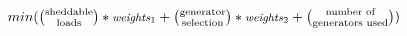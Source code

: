 \documentclass[10pt,journal,letterpaper,compsoc, draftclsnofoot, onecolumn]{IEEEtran} %
\newcommand*{\bfrac}[2]{\genfrac{(}{)}{0pt}{}{#1}{#2}} %
\begin{document}


$min(\bfrac{\text{sheddable}}{\text{loads}} * \text{\footnotesize \emph{weights}$_1$} +  \bfrac{\text{generator}}{\text{selection}} * \text{\footnotesize \emph{weights}$_2$} +  \bfrac{\text{number of}}{\text{generators used}})$
\end{document}
